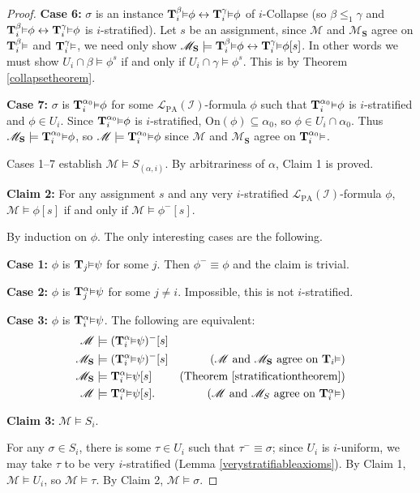 \documentclass[reqno]{article}
\theoremstyle{definition}
\def\L{\mathscr{L}}
\def\M{\mathscr{M}}
\def\T{\mathbf{T}}
\def\S{\mathbf{S}}
\def\LPA{\L_{\mathrm{PA}}}
\def\indset{\mathcal I}
\def\onset{\mathrm{On}}
\renewcommand{\Pr}[1]{\T_{#1}\mbox{\small${\vDash}$}}
\newcommand{\Prr}[2]{\T^{#1}_{#2}\mbox{\small${\vDash}$}}
\newcommand{\case}[1]{\textbf{Case #1:}}
\newcommand{\claim}[1]{\textbf{Claim #1:}}
\begin{document}
\begin{proof}
\item
\case6
$\sigma$ is an instance $\Prr\beta i\phi\leftrightarrow\Prr\gamma i\phi$
of $i$-Collapse (so $\beta\leq_1\gamma$ and $\Prr\beta i\phi\leftrightarrow\Prr\gamma i\phi$ is
$i$-stratified).
Let $s$ be an assignment,
since $\M$ and $\M_\S$ agree on $\Prr\beta i$ and $\Prr\gamma i$, we need only show
$\M_\S\models\Prr\beta i\phi\leftrightarrow\Prr\gamma i\phi[s]$.
In other words we must show $U_i\cap\beta\models\phi^s$ if and only if $U_i\cap\gamma\models\phi^s$.
This is by Theorem \ref{collapsetheorem}.

\item
\case7
$\sigma$ is $\Prr{\alpha_0}i\phi$ for some $\LPA(\indset)$-formula $\phi$
such that $\Prr{\alpha_0}i\phi$ is $i$-stratified and $\phi\in U_i$.
Since $\Prr{\alpha_0}i\phi$
is $i$-stratified, $\onset(\phi)\subseteq\alpha_0$, so $\phi\in U_i\cap\alpha_0$.
Thus $\M_\S\models \Prr{\alpha_0}i\phi$,
so $\M\models \Prr{\alpha_0}i\phi$ since $\M$ and $\M_\S$ agree on $\Prr{\alpha_0}i$.

\item
Cases 1--7
establish $\M\models S_{(\alpha,i)}$.
By arbitrariness of $\alpha$, Claim 1 is proved.


\item
\claim2
For any assignment $s$
and any very $i$-stratified $\LPA(\indset)$-formula $\phi$,
$\M\models\phi[s]$ if and only if $\M\models\phi^-[s]$.

\item
By induction on $\phi$.
The only interesting cases are the following.

\item
\case1
$\phi$ is $\Pr j\psi$ for some $j$.
Then $\phi^-\equiv\phi$ and the claim is trivial.

%
%

\item
\case2 $\phi$ is $\Prr \alpha j\psi$ for some $j\not=i$.  Impossible, this is not $i$-stratified.

\item
\case3
$\phi$ is $\Prr\alpha i\psi$.
The following are equivalent:
\begin{align*}
\M &\models (\Prr\alpha i\psi)^-[s]\\
\M_\S &\models (\Prr\alpha i\psi)^-[s]
  &\mbox{($\M$ and $\M_\S$ agree on $\Pr i$)}\\
\M_\S &\models \Prr\alpha i\psi[s]
  &\mbox{(Theorem \ref{stratificationtheorem})}\\
\M &\models \Prr\alpha i\psi[s].
  &\mbox{($\M$ and $\M_S$ agree on $\Prr\alpha i$)}
\end{align*}


\item
\claim3
$\M\models S_i$.

\item
For any $\sigma\in S_i$,
there is some $\tau\in U_i$ such that $\tau^-\equiv\sigma$;
since $U_i$ is $i$-uniform, we may take $\tau$ to be very $i$-stratified
(Lemma \ref{verystratifiableaxioms}).
By Claim 1, $\M\models U_i$,
so $\M\models\tau$.
By Claim 2, $\M\models\sigma$.
\end{proof}
\end{document}
